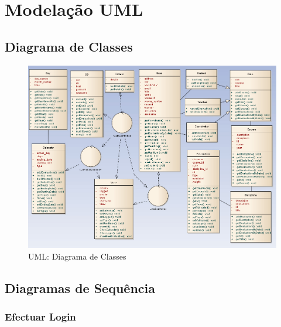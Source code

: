 \chapter{Modelação UML}

\section{Diagrama de Classes}
\begin{figure}[!htbp]
\centering
\includegraphics{imagens/diagrama_de_classes.jpg}
\caption{UML: Diagrama de Classes}
\label{fig:diagrama_de_classes}
\end{figure}

\section{Diagramas de Sequência}

\subsection{Efectuar Login}

